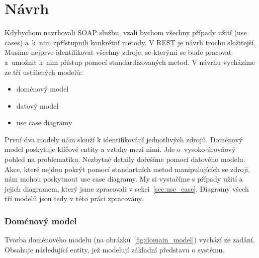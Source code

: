 \chapter{Návrh}

Kdybychom navrhovali SOAP službu, vzali bychom všechny případy užití (use cases) a~k~nim zpřístupnili
konkrétní metody. V REST je návrh trochu složitejší.
Musíme nejprve identifikovat všechny zdroje, se kterými se bude pracovat a~umožnit
k~nim přístup pomocí standardizovaných metod. V návrhu vycházíme ze tří ustálených modelů:

\begin{itemize}
\item doménový model
\item datový model
\item use case diagramy
\end{itemize}

První dva modely nám slouží k identifikování jednotlivých zdrojů.
Doménový model poskytuje klíčové entity a vztahy mezi nimi.
Jde o~vysoko-úrovňový pohled na problematiku. Nezbytné detaily dořešíme pomocí datového modelu. 
Akce, které nejdou pokrýt pomocí standartních metod manipulujících se zdroji, nám mohou poskytnout use case diagramy.
My si vystačíme s případy užití a jejich diagramem, který jsme zpracovali v sekci~\ref{sec:use_case}. 
Diagramy všech tří modelů jsou tedy v této práci zpracovány.

\subsection{Doménový model}

Tvorba doménového modelu (na obrázku~\ref{fig:domain_model}) vychází ze zadání. Obsahuje následující entity,
jež modelují základní představu o systému.

